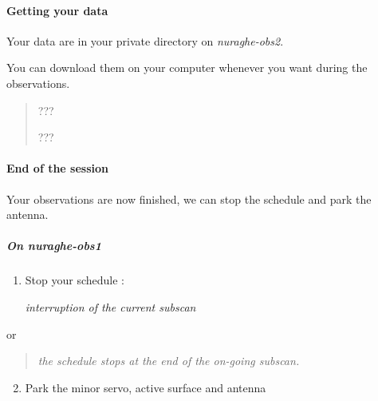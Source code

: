 \documentclass[letterpaper,10pt,english]{sphinxmanual}
\begin{document}
\paragraph{Getting your data}
\label{SpectralLine/L-band/SARDARA/get-data:getting-your-data}\label{SpectralLine/L-band/SARDARA/get-data::doc}
Your data are in your private directory on \emph{nuraghe-obs2}.

You can download them on your computer whenever you want during the observations.
\begin{quote}

  ???

 ???
\end{quote}


\paragraph{End of the session}
\label{SpectralLine/L-band/SARDARA/stop-session:end-of-the-session}\label{SpectralLine/L-band/SARDARA/stop-session::doc}
Your observations are now finished, we can stop the schedule and park
the antenna.


\subparagraph{On nuraghe-obs1}
\label{SpectralLine/L-band/SARDARA/stop-session:on-nuraghe-obs1}\begin{enumerate}
\item {} 
Stop your schedule :

   \emph{interruption of the current subscan}

\end{enumerate}

or
\begin{quote}

    \emph{the schedule stops at the end of the on-going subscan.}
\end{quote}
\begin{enumerate}
\setcounter{enumi}{1}
\item {} 
Park the minor servo, active surface and antenna





\end{enumerate}
\end{document}
